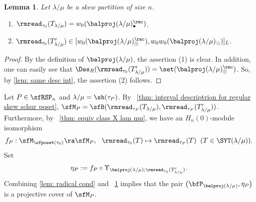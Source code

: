 \documentclass[12pt, reqno]{amsart}
\newtheorem{lemma}[theorem]{Lemma}
\theoremstyle{definition}
\numberwithin{equation}{section} \numberwithin{figure}{section}
\numberwithin{table}{section}
\begin{document}
\begin{lemma}\label{lem: balproj and read}
Let $\lambda/\mu$ be a skew partition of size $n$.
\begin{enumerate}[label = {\rm (\arabic*)}]
\item 
$\rmread_{\tau_0}(T_{\lambda/\mu}) = w_0(\balproj(\lambda/\mu)_{\bullet}^\rmc)$.
\item 
$\rmread_{\tau_0}(T'_{\lambda/\mu}) \in [w_0(\balproj(\lambda/\mu)_{\odot}^\rmc), w_0w_0(\balproj(\lambda/\mu)_{\odot})]_L$.
\end{enumerate}
\end{lemma}

\begin{proof}
By the definition of $\balproj(\lambda/\mu)$, the assertion (1) is clear.
In addition, one can easily see that
$\Des_R(\rmread_{\tau_0}(T'_{\lambda/\mu})) = \set(\balproj(\lambda/\mu)_{\odot}^\rmc)$.
So, by \cref{lem: same desc int}, the assertion (2) follows.
\end{proof}

Let $P \in \sfRSP_n$ and $\lambda/\mu = \sh(\tau_P)$.
By ~\cref{thm: interval descriptrion for regular skew schur poset}, 
$\sfM_P = \sfB(\rmread_{\tau_P}(T_{\lambda/\mu}), \rmread_{\tau_P}(T'_{\lambda/\mu}))$.
Furthermore, by ~\cref{thm: equiv class X lam mu}, we have an $H_n(0)$-module isomorphism
$$
f_{P}: \sfM_{\sfposet(\tau_0)} \ra \sfM_P,
\ \ 
\rmread_{\tau_0}(T) \mapsto \rmread_{\tau_P}(T) \;\;(T \in \SYT(\lambda/\mu)).
$$
Set 
$$
\eta_P := f_P \circ \Upsilon_{\balproj(\lambda/\mu); \rmread_{\tau_0}(T'_{\lambda/\mu})}.
$$
Combining \cref{lem: radical cond} and ~\cref{lem: balproj and read} implies that the pair $\left(\bfP_{\balproj(\lambda/\mu)}, \eta_P\right)$
is a projective cover of $\sfM_P$.
\end{document}

